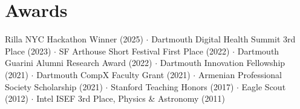 \documentclass[letterpaper,10pt]{article}
\begin{document}
\section{Awards}
\small
\hspace{0.15in}
Rilla NYC Hackathon Winner (2025) $\cdot$
Dartmouth Digital Health Summit 3rd Place (2023) $\cdot$
SF Arthouse Short Festival First Place (2022) $\cdot$
Dartmouth Guarini Alumni Research Award (2022) $\cdot$
Dartmouth Innovation Fellowship (2021) $\cdot$
Dartmouth CompX Faculty Grant (2021) $\cdot$
Armenian Professional Society Scholarship (2021) $\cdot$
Stanford Teaching Honors (2017) $\cdot$
Eagle Scout (2012) $\cdot$
Intel ISEF 3rd Place, Physics \& Astronomy (2011)
\end{document}
